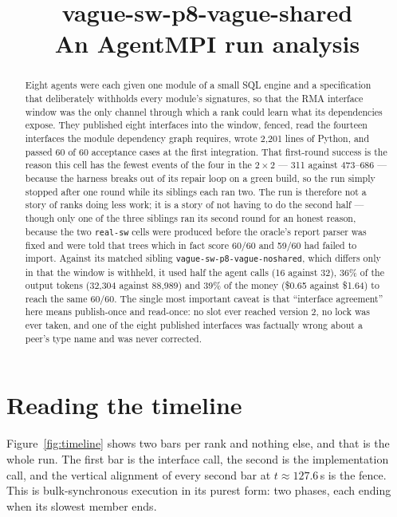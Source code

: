 \documentclass[11pt]{article}
\title{\textbf{vague-sw-p8-vague-shared}\\[2pt]\large An AgentMPI run analysis}
\author{}
\date{}
\begin{document}
\maketitle

\begin{abstract}
Eight agents were each given one module of a small SQL engine and a specification that
deliberately withholds every module's signatures, so that the RMA interface window was the only
channel through which a rank could learn what its dependencies expose. They published eight
interfaces into the window, fenced, read the fourteen interfaces the module dependency graph
requires, wrote 2{,}201 lines of Python, and passed 60 of 60 acceptance cases at the first
integration. That first-round success is the reason this cell has the fewest events of the four
in the $2\times2$ --- 311 against 473--686 --- because the harness breaks out of its repair loop
on a green build, so the run simply stopped after one round while its siblings each ran two. The
run is therefore not a story of ranks doing less work; it is a story of not having to do the
second half --- though only one of the three siblings ran its second round for an honest reason,
because the two \texttt{real-sw} cells were produced before the oracle's report parser was fixed
and were told that trees which in fact score 60/60 and 59/60 had failed to import. Against its
matched sibling \texttt{vague-sw-p8-vague-noshared}, which differs only
in that the window is withheld, it used half the agent calls (16 against 32), 36\% of the output
tokens (32{,}304 against 88{,}989) and 39\% of the money (\$0.65 against \$1.64) to reach the
same 60/60. The single most important caveat is that ``interface agreement'' here means
publish-once and read-once: no slot ever reached version 2, no lock was ever taken, and one of
the eight published interfaces was factually wrong about a peer's type name and was never
corrected.
\end{abstract}



\section{Reading the timeline}

Figure~\ref{fig:timeline} shows two bars per rank and nothing else, and that is the whole run.
The first bar is the interface call, the second is the implementation call, and the vertical
alignment of every second bar at $t\approx127.6$\,s is the fence. This is bulk-synchronous
execution in its purest form: two phases, each ending when its slowest member ends.
\end{document}
